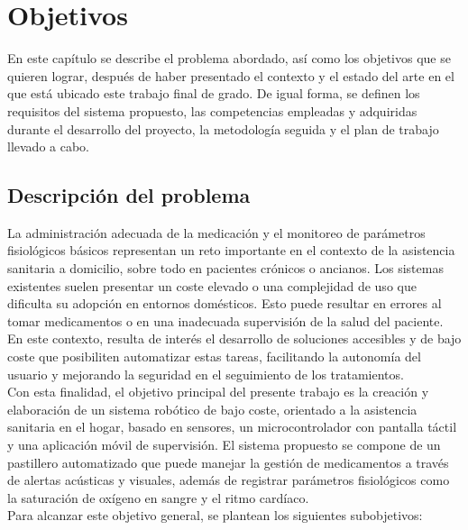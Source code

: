 \chapter{Objetivos}
\label{cap:capitulo2}

\vspace{1cm}

En este capítulo se describe el problema abordado, así como los objetivos que se quieren lograr, después de haber presentado el contexto y el estado del arte en el que está ubicado este trabajo final de grado. De igual forma, se definen los requisitos del sistema propuesto, las competencias empleadas y adquiridas durante el desarrollo del proyecto, la metodología seguida y el plan de trabajo llevado a cabo.\\

\section{Descripción del problema}
\label{sec:descripcion}

La administración adecuada de la medicación y el monitoreo de parámetros fisiológicos básicos representan un reto importante en el contexto de la asistencia sanitaria a domicilio, sobre todo en pacientes crónicos o ancianos. Los sistemas existentes suelen presentar un coste elevado o una complejidad de uso que dificulta su adopción en entornos domésticos. Esto puede resultar en errores al tomar medicamentos o en una inadecuada supervisión de la salud del paciente. En este contexto, resulta de interés el desarrollo de soluciones accesibles y de bajo coste que posibiliten automatizar estas tareas, facilitando la autonomía del usuario y mejorando la seguridad en el seguimiento de los tratamientos.\\

Con esta finalidad, el objetivo principal del presente trabajo es la creación y elaboración de un sistema robótico de bajo coste, orientado a la asistencia sanitaria en el hogar, basado en sensores, un microcontrolador con pantalla táctil y una aplicación móvil de supervisión. El sistema propuesto se compone de un pastillero automatizado que puede manejar la gestión de medicamentos a través de alertas acústicas y visuales, además de registrar parámetros fisiológicos como la saturación de oxígeno en sangre y el ritmo cardíaco.\\

Para alcanzar este objetivo general, se plantean los siguientes subobjetivos:

